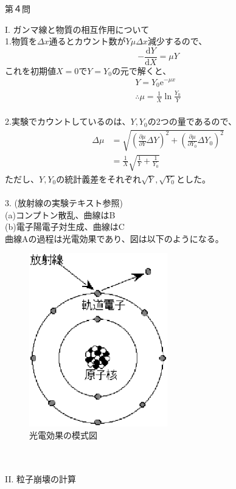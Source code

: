 \documentclass[fleqn]{jbook}
\begin{document}
\begin{answer}{第４問}{}

I. ガンマ線と物質の相互作用について\\
1.物質を$\Delta x$通るとカウント数が$Y\mu \Delta x$減少するので、
\begin{equation}
-\frac{\mathrm{d}Y}{\mathrm{d}X}=\mu Y
\end{equation}
これを初期値$X=0でY=Y_0$の元で解くと、
\begin{align}
Y=Y_0\mathrm{e}^{-\mu x} \\
\therefore \mu =\frac{1}{X} \ln \frac{Y_0}{Y}
\end{align}
\\
2.実験でカウントしているのは、$Y,Y_0$の2つの量であるので、
\begin{align}
\Delta \mu &=\sqrt{(\frac{\partial \mu }{\partial Y}\Delta Y)^2+(\frac{\partial \mu }{\partial Y_0}\Delta Y_0)^2}\\
           &=\frac{1}{X}\sqrt{\frac{1}{Y}+\frac{1}{Y_0}}
\end{align}
ただし、$Y,Y_0$の統計義差をそれぞれ$\sqrt{Y},\sqrt{Y_0}$とした。\\
\\
3. (放射線の実験テキスト参照)\\
(a)コンプトン散乱、曲線はB\\
(b)電子陽電子対生成、曲線はC\\
曲線Aの過程は光電効果であり、図は以下のようになる。
\begin{figure}[h]
\centering
\includegraphics[width=6cm,clip]{2004phy4-1.eps}
\caption{光電効果の模式図}
\end{figure}
\\
\\
II. 粒子崩壊の計算\\
{
}
\end{answer}
\end{document}
